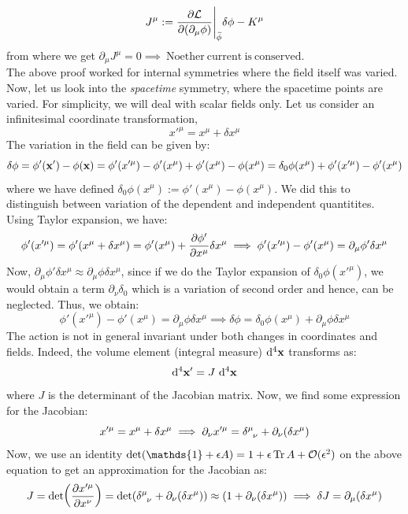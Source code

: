 \begin{align}\label{eqn:noethercurr}
    J^\mu := \pdv{\mathcal L}{(\partial_\mu{\phi})}\Bigg|_{\widetilde{\phi}}\delta{\phi} - K^\mu
\end{align}
from where we get $\partial_\mu J^\mu =0\implies \mathrm{\ Noether\ current \ is \ conserved}$.\\[0.2cm]
The above proof worked for internal symmetries where the field itself was varied. Now, let us look into the \textit{spacetime} symmetry, where the spacetime points are varied. For simplicity, we will deal with scalar fields only. Let us consider an infinitesimal coordinate transformation,
$$x'^\mu = x^\mu + \delta x^\mu$$
The variation in the field can be given by:
$$\delta\phi =\phi'(\vb{x}')- \phi(\vb{x}) = \phi'(x'^\mu)- \phi'(x^\mu)+ \phi'(x^\mu) -\phi(x^\mu)=\delta_0\phi(x^\mu)+\phi'({x}'^\mu)-\phi'(x^\mu) $$
where we have defined $\delta_0\phi(x^\mu):=\phi'(x^\mu)-\phi(x^\mu)$. We did this to distinguish between variation of the dependent and independent quantitites. 
Using Taylor expansion, we have:
$$\phi'(x'^\mu ) = \phi'(x^\mu +\delta x^\mu) = \phi'(x^\mu) + \pdv{\phi'}{x^\mu}\delta x^\mu\implies \phi'(x'^\mu )-\phi'(x^\mu) = \partial_\mu\phi'\delta x^\mu$$
Now, $\partial_\mu\phi'\delta x^\mu \approx \partial_\mu\phi\delta x^\mu$, since if we do the Taylor expansion of $\delta_0\phi(x'^\mu)$, we would obtain a term $\partial_\nu\delta_0$ which is a variation of second order and hence, can be neglected. Thus, we obtain:
$$\phi'(x'^\mu )-\phi'(x^\mu) = \partial_\mu\phi\delta x^\mu\implies \delta\phi = \delta_0\phi(x^\mu) + \partial_\mu\phi\delta x^\mu$$
The action is not in general invariant under both changes in coordinates and fields. Indeed, the volume element (integral measure) $\dd^4 \vb{x}$ transforms as:
$$\dd^4\vb{x}' = J\  \dd^4\vb{x}$$
where $J$ is the determinant of the Jacobian matrix. Now, we find some expression for the Jacobian: 
$$x'^\mu = x^\mu + \delta x^\mu\implies \partial_\nu x'^\mu = \tsr{\delta}{\mu}{\nu}+\partial_\nu(\delta x^\mu)$$
Now, we use an identity $\det(\mathds{1}+ \epsilon A) = 1 + \epsilon \Tr A+\SO(\epsilon^2)$ on the above equation to get an approximation for the Jacobian as:
$$J= \det(\pdv{x'^\mu}{x^\nu}) = \det(\tsr{\delta}{\mu}{\nu}+\partial_\nu(\delta x^\mu))\approx (1+\partial_\nu(\delta x^\mu)) \implies \delta J =\partial_\mu(\delta x^\mu) $$
